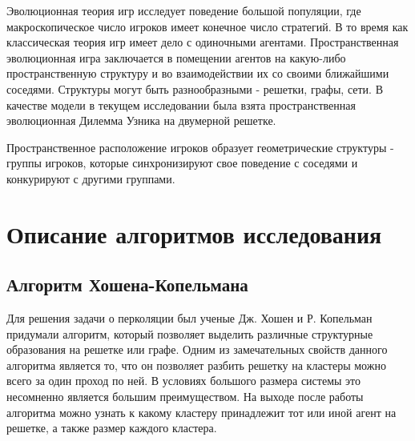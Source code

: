 \documentclass[a4paper]{article}
\begin{document}
	\par Эволюционная теория игр исследует поведение большой популяции, где макроскопическое
	число игроков имеет конечное число стратегий. В то время как классическая теория игр имеет дело с одиночными агентами. Пространственная эволюционная игра заключается в помещении агентов на какую-либо пространственную структуру и во взаимодействии их со своими ближайшими соседями. Структуры могут быть разнообразными - решетки, графы, сети. В качестве модели в текущем исследовании была взята пространственная эволюционная Дилемма Узника на двумерной решетке.
	
	\par Пространственное расположение игроков образует геометрические структуры - группы игроков, которые синхронизируют свое поведение с соседями и конкурируют с другими группами.
	 
	\section{Описание алгоритмов исследования}
	
	\subsection{Алгоритм Хошена-Копельмана}
	
	\par Для решения задачи о перколяции был ученые Дж. Хошен и Р. Копельман придумали алгоритм, который позволяет выделить различные структурные образования на решетке или графе\cite{hk76}. Одним из замечательных свойств данного алгоритма является то, что он позволяет разбить решетку на кластеры можно всего за один проход по ней. В условиях большого размера системы это несомненно является большим преимуществом. На выходе после работы алгоритма можно узнать к какому кластеру принадлежит тот или иной агент на решетке, а также размер каждого кластера.
	
\end{document}
